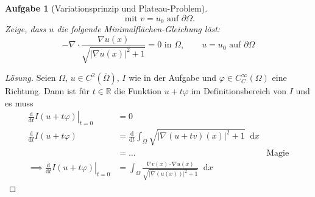 \documentclass{scrartcl}
\newcommand{\abs}[1]{\left\lvert #1 \right\rvert}
\newcommand{\restr}[2]{\left. #1 \right|_{#2}}
\newcommand{\intd}{\mathop{} \mathrm{d}}
\newcommand{\ableitung}[1]{
  \frac
    {\mathrm{d}}
    {\mathrm{d} #1}
  }
\newcommand{\Rand}[1]{\partial #1}
\newcommand{\reals}{\mathbb{R}}
\newcommand{\closure}[1]{\overline{#1}}
\newtheorem {problem} {Aufgabe}
\theoremstyle{remark}
\newenvironment{loesung}
  {\begin{proof}[Lösung]}
  {\end{proof}}
\begin{document}
\begin{problem}[Variationsprinzip und Plateau-Problem]
\begin{equation}
    \text{ mit } v = u_0 \text{ auf } \Rand {\Omega}.
  \end{equation}
  Zeige, dass $u$ die folgende Minimalflächen-Gleichung löst:
  \begin{equation}
    - \nabla
    \cdot
    \frac
      {\nabla u(x)}
      {\sqrt{\abs{\nabla u(x)}^2 + 1}}
    = 0 \text{ in } \Omega, \qquad u = u_0 \text{ auf } \Rand{\Omega}
  \end{equation}

  \end{problem}

  \begin{loesung}
    Seien $\Omega$, $u \in C^2(\closure{\Omega})$, $I$ wie in der Aufgabe
    und $\varphi \in C_C^{\infty}(\Omega)$ eine Richtung.
    Dann ist für $t \in \reals$ die Funktion $u + t\varphi$ im Definitionsbereich von $I$ und es muss
    \begin{align}
      \restr {\ableitung{t} I(u + t\varphi)}{t = 0} & = 0 \\
      \ableitung{t} I(u + t\varphi)  &=
      \ableitung{t} \int_{\Omega} \sqrt{
        \abs{
          \nabla(u+tv) (x)
        }^2 + 1
      } \intd x\\
      & = \dots & \text{Magie}\\
      \implies \restr {\ableitung{t} I(u + t\varphi)}{t = 0} & =
      \int_{\Omega} \frac
        {\nabla v (x) \cdot \nabla u(x)}
        {\sqrt{
          \abs{
            \nabla (u(x))
            }^2 + 1
          }
        }
      \intd x
    \end{align}

  \end{loesung}
\end{document}
